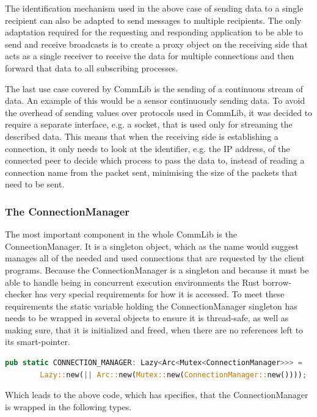 The identification mechanism used in the above case of sending data to a single recipient can also be adapted to send messages to multiple recipients.
The only adaptation required for the requesting and responding application to be able to send and receive broadcasts is to create a proxy object on the receiving side that acts as a single 
receiver to receive the data for multiple connections and then forward that data to all subscribing processes.  

The last use case covered by CommLib is the sending of a continuous stream of data. An example of this would be a sensor continuously sending data. To avoid the overhead of sending values over
protocols used in CommLib, it was decided to require a separate interface, e.g. a socket, that is used only for streaming the described data. This means that when the receiving side
is establishing a connection, it only needs to look at the identifier, e.g. the IP address, of the connected peer to decide which process to pass the data to, instead of reading a connection 
name from the packet sent, minimising the size of the packets that need to be sent. 

\subsubsection{The ConnectionManager}
The most important component in the whole CommLib is the ConnectionManager. It is a singleton object, which as the name would suggest manages all of the needed and used connections that are
requested by the client programs. Because the ConnectionManager is a singleton and because it must be able to handle being in concurrent execution environments the Rust borrow-checker has very
special requirements for how it is accessed. To meet these requirements the static variable holding the ConnectionManager singleton has needs to be wrapped in several objects to ensure it is
thread-safe, as well as making sure, that it is initialized and freed, when there are no references left to its smart-pointer. 

\begin{lstlisting}[language=Rust]
	pub static CONNECTION_MANAGER: Lazy<Arc<Mutex<ConnectionManager>>> =
	    Lazy::new(|| Arc::new(Mutex::new(ConnectionManager::new())));
\end{lstlisting}
Which leads to the above code, which has specifies, that the ConnectionManager is wrapped in the following types.

